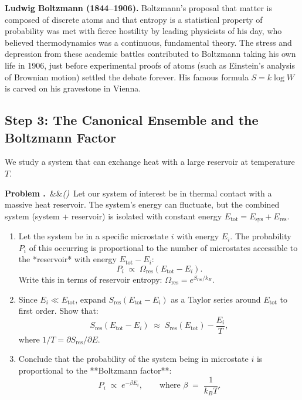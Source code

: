 \documentclass[12pt, a4paper, twoside]{book}
\newcounter{problem}[chapter]
\newcommand{\problem}[1][]{\refstepcounter{problem}\medskip\noindent
  \textcolor{accent}{\textbf{Problem \theproblem.}}\ \ifx&#1&\else\textit{(#1)}\ \fi}
\begin{document}
\begin{historybox}
\textbf{Ludwig Boltzmann (1844--1906).}
Boltzmann's proposal that matter is composed of discrete atoms and that entropy is a statistical property of probability was met with fierce hostility by leading physicists of his day, who believed thermodynamics was a continuous, fundamental theory. The stress and depression from these academic battles contributed to Boltzmann taking his own life in 1906, just before experimental proofs of atoms (such as Einstein's analysis of Brownian motion) settled the debate forever. His famous formula $S = k \log W$ is carved on his gravestone in Vienna.
\end{historybox}

\subsection{Step 3: The Canonical Ensemble and the Boltzmann Factor}

We study a system that can exchange heat with a large reservoir at temperature $T$.

\begin{explobox}
\problem Let our system of interest be in thermal contact with a massive heat reservoir. The system's energy can fluctuate, but the combined system (system + reservoir) is isolated with constant energy $E_{\text{tot}} = E_{\text{sys}} + E_{\text{res}}$.
\begin{enumerate}[label=(\alph*), topsep=2pt]
  \item Let the system be in a specific microstate $i$ with energy $E_i$. The probability $P_i$ of this occurring is proportional to the number of microstates accessible to the *reservoir* with energy $E_{\text{tot}} - E_i$:
  \[
    P_i \;\propto\; \Omega_{\text{res}}(E_{\text{tot}} - E_i).
  \]
  Write this in terms of reservoir entropy: $\Omega_{\text{res}} = e^{S_{\text{res}}/k_B}$.
  \item Since $E_i \ll E_{\text{tot}}$, expand $S_{\text{res}}(E_{\text{tot}} - E_i)$ as a Taylor series around $E_{\text{tot}}$ to first order. Show that:
  \[
    S_{\text{res}}(E_{\text{tot}} - E_i) \;\approx\; S_{\text{res}}(E_{\text{tot}}) - \frac{E_i}{T},
  \]
  where $1/T = \partial S_{\text{res}}/\partial E$.
  \item Conclude that the probability of the system being in microstate $i$ is proportional to the **Boltzmann factor**:
  \[
    P_i \;\propto\; e^{-\beta E_i}, \qquad \text{where } \beta \;=\; \frac{1}{k_B T}.
  \]
\end{enumerate}
\end{explobox}
\end{document}
